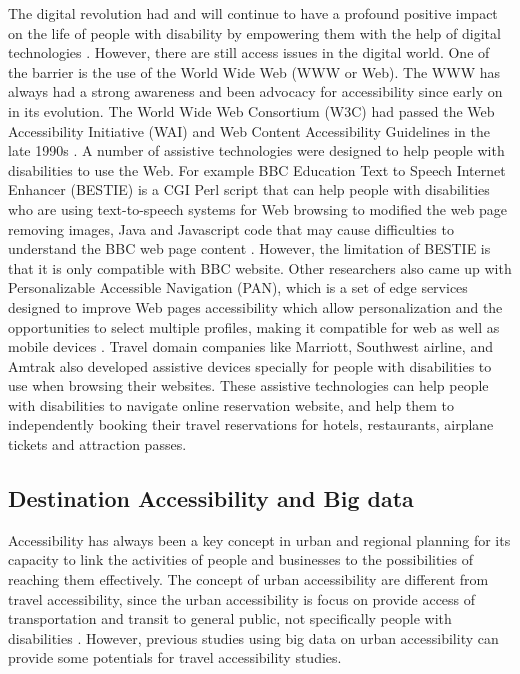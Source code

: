 The digital revolution had and will continue to have a profound positive impact on the life of people with
disability by empowering them with the help of digital technologies \cite{Appleyard2005}. However, there are
still access issues in the digital world. One of the barrier is the use of the World Wide Web (WWW or Web).
The WWW has always had a strong awareness and been advocacy for accessibility since early on in its
evolution. The World Wide Web Consortium (W3C) had passed the Web Accessibility Initiative (WAI) and Web
Content Accessibility Guidelines in the late 1990s \cite{Appleyard2005}. A number of assistive technologies
were designed to help people with disabilities to use the Web. For example BBC Education Text to Speech
Internet Enhancer (BESTIE) is a CGI Perl script that can help people with disabilities who are using
text-to-speech systems for Web browsing to modified the web page removing images, Java and Javascript code
that may cause difficulties to understand the BBC web page content \cite{Erra}. 
However, the limitation of BESTIE is that it is only compatible with BBC website. Other researchers also
came up with Personalizable Accessible Navigation (PAN), which is a set of edge services designed to improve
Web pages accessibility which allow  personalization and the opportunities to select multiple profiles,
making it compatible for web as well as mobile devices \cite{info:doi/10.2196/mhealth.3956}.
Travel domain companies like Marriott, Southwest airline, and Amtrak also developed assistive devices specially for people with disabilities to use when browsing their websites. 
These assistive technologies can help people with disabilities to navigate online reservation website, and help them to independently booking their travel reservations for hotels, restaurants, airplane tickets and attraction passes.


\subsection{Destination Accessibility and Big data}
Accessibility has always been a key concept in urban and regional planning for its capacity to link the activities of people and businesses to the possibilities of reaching them effectively. The concept of urban accessibility are different from travel accessibility, since the urban accessibility is focus on provide access of transportation and transit to general public, not specifically people with disabilities \cite{moya2016dynamic}. However, previous studies using big data on urban accessibility can provide some potentials for travel accessibility studies.




